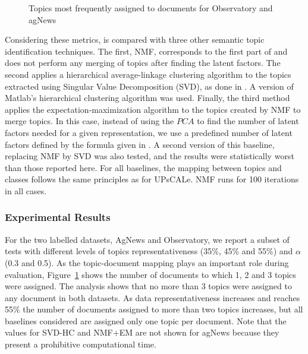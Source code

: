 \begin{figure}[!t]
{\begin{minipage}[c]{.43\textwidth}
		\end{minipage}
	}
	\caption{Topics most frequently assigned to documents %
	for Observatory and agNews}
	\label{fig:histograms}
\end{figure}

Considering these metrics, \method is compared with three other semantic topic identification techniques. The first, NMF, corresponds to the first part of \method and does not perform any merging of topics after finding the latent factors. The second applies a hierarchical average-linkage clustering algorithm to the topics extracted using Singular Value Decomposition (SVD), as done in \cite{kuhn2007semantic}. A version of Matlab's hierarchical clustering algorithm was used. Finally, the third method applies the expectation-maximization algorithm %
to the topics created by NMF to merge topics. In this case, instead of using the $PCA$ to find the number of latent factors needed for a given representation, we use a predefined number of latent factors defined by the formula given in \cite{kuhn2007semantic}. A second version of this baseline, replacing NMF by SVD was also tested, and the results were statistically worst than those reported here.
For all baselines, the mapping between topics and classes follows the same principles as for UPsCALe. NMF runs for 100 iterations in all
cases.


\subsubsection{Experimental Results}

For the two labelled datasets, AgNews and Observatory, we report a subset of tests with different levels of topics representativeness (35\%, 45\% and 55\%) and $\alpha$ (0.3 and 0.5). %
As the topic-document mapping plays an important role during evaluation, Figure~\ref{fig:histograms} shows %
the number of documents to which 1, 2 and 3 topics were assigned. The analysis shows that no more than 3 topics were assigned to any document in both datasets. As data representativeness increases and reaches 55\% the number of documents assigned to more than two topics increases, but all baselines considered are assigned only one topic per document. Note that the values for SVD-HC and NMF+EM are not shown for agNews because they present a prohibitive computational time. 


